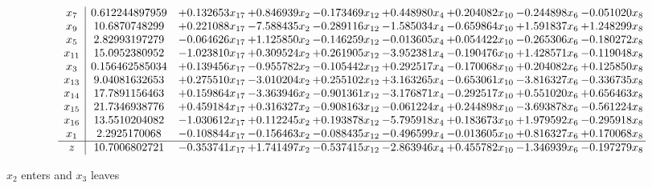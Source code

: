 \documentclass[10pt]{article}
\begin{document}
 \[\begin{array}{c| c c@{\hskip 2pt} c@{\hskip 2pt} c@{\hskip 2pt} c@{\hskip 2pt} c@{\hskip 2pt} c@{\hskip 2pt} c@{\hskip 2pt} }
 x_{7}   &  0.612244897959 & + 0.132653 x_{17} & + 0.846939 x_{2} & -0.173469 x_{12} & + 0.448980 x_{4} & + 0.204082 x_{10} & -0.244898 x_{6} & -0.051020 x_{8}\\
 x_{9}   &  10.6870748299 & + 0.221088 x_{17} & -7.588435 x_{2} & -0.289116 x_{12} & -1.585034 x_{4} & -0.659864 x_{10} & + 1.591837 x_{6} & + 1.248299 x_{8}\\
 x_{5}   &  2.82993197279 & -0.064626 x_{17} & + 1.125850 x_{2} & -0.146259 x_{12} & -0.013605 x_{4} & + 0.054422 x_{10} & -0.265306 x_{6} & -0.180272 x_{8}\\
 x_{11}   &  15.0952380952 & -1.023810 x_{17} & + 0.309524 x_{2} & + 0.261905 x_{12} & -3.952381 x_{4} & -0.190476 x_{10} & + 1.428571 x_{6} & -0.119048 x_{8}\\
 x_{3}   &  0.156462585034 & + 0.139456 x_{17} & -0.955782 x_{2} & -0.105442 x_{12} & + 0.292517 x_{4} & -0.170068 x_{10} & + 0.204082 x_{6} & + 0.125850 x_{8}\\
 x_{13}   &  9.04081632653 & + 0.275510 x_{17} & -3.010204 x_{2} & + 0.255102 x_{12} & + 3.163265 x_{4} & -0.653061 x_{10} & -3.816327 x_{6} & -0.336735 x_{8}\\
 x_{14}   &  17.7891156463 & + 0.159864 x_{17} & -3.363946 x_{2} & -0.901361 x_{12} & -3.176871 x_{4} & -0.292517 x_{10} & + 0.551020 x_{6} & + 0.656463 x_{8}\\
 x_{15}   &  21.7346938776 & + 0.459184 x_{17} & + 0.316327 x_{2} & -0.908163 x_{12} & -0.061224 x_{4} & + 0.244898 x_{10} & -3.693878 x_{6} & -0.561224 x_{8}\\
 x_{16}   &  13.5510204082 & -1.030612 x_{17} & + 0.112245 x_{2} & + 0.193878 x_{12} & -5.795918 x_{4} & + 0.183673 x_{10} & + 1.979592 x_{6} & -0.295918 x_{8}\\
 x_{1}   &  2.2925170068 & -0.108844 x_{17} & -0.156463 x_{2} & -0.088435 x_{12} & -0.496599 x_{4} & -0.013605 x_{10} & + 0.816327 x_{6} & + 0.170068 x_{8}\\
\hline
z    &  10.7006802721 & -0.353741 x_{17} & + 1.741497 x_{2} & -0.537415 x_{12} & -2.863946 x_{4} & + 0.455782 x_{10} & -1.346939 x_{6} & -0.197279 x_{8}\\
\end{array}\]


 $ x_{2} $ enters and $ x_{3} $ leaves 
\end{document}
